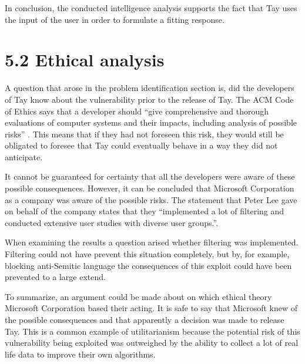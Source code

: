 In conclusion, the conducted intelligence analysis supports the fact that Tay uses the input of the user in order to formulate a fitting response.

\section*{\textbf{5.2 Ethical analysis}}
A question that arose in the problem identification section is, did the developers of Tay know about the vulnerability prior to the release of Tay. The ACM Code of Ethics says that a developer should “give comprehensive and thorough evaluations of computer systems and their impacts, including analysis of possible risks” \cite{ACM}. This means that if they had not foreseen this risk, they would still be obligated to foresee that Tay could eventually behave in a way they did not anticipate.

It cannot be guaranteed for certainty that all the developers were aware of these possible consequences. However, it can be concluded that Microsoft Corporation as a company was aware of the possible risks. The statement that Peter Lee gave on behalf of the company states that they “implemented a lot of filtering and conducted extensive user studies with diverse user groups.”\cite{statementpeterlee}.

When examining the results a question arised whether filtering was implemented. Filtering could not have prevent this situation completely, but by, for example, blocking anti-Semitic language the consequences of this exploit could have been prevented to a  large extend.

To summarize, an argument could be made about on which ethical theory Microsoft Corporation based their acting. It is safe to say that Microsoft knew of the possible consequences and that apparently a decision was made to release Tay. This is a common example of utilitarianism because the potential risk of this vulnerability being exploited was outweighed by the ability to collect a lot of real life data to improve their own algorithms.
